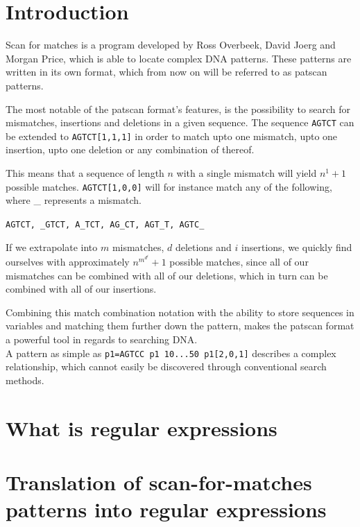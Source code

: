 \documentclass[12pt]{article}
\begin{document}
\newpage

\section{Introduction}

Scan for matches is a program developed by Ross Overbeek, David Joerg and Morgan Price, which is able to locate complex DNA patterns. These patterns are written in its own format, which from now on will be referred to as patscan patterns.\cite{scan-for-matches}

The most notable of the patscan format's features, is the possibility to search for mismatches, insertions and deletions in a given sequence. The sequence \texttt{AGTCT} can be extended to \texttt{AGTCT[1,1,1]} in order to match upto one mismatch, upto one insertion, upto one deletion or any combination of thereof.

This means that a sequence of length $n$ with a single mismatch will yield $n^1+1$ possible matches. \texttt{AGTCT[1,0,0]} will for instance match any of the following, where \_ represents a mismatch.

\texttt{AGTCT, \_GTCT, A\_TCT, AG\_CT, AGT\_T, AGTC\_}

If we extrapolate into $m$ mismatches, $d$ deletions and $i$ insertions, we quickly find ourselves with approximately  $n^{m^{d^{i}}}+1$ possible matches, since all of our mismatches can be combined with all of our deletions, which in turn can be combined with all of our insertions.

Combining this match combination notation with the ability to store sequences in variables and matching them further down the pattern, makes the patscan format a powerful tool in regards to searching DNA. \\
A pattern as simple as \texttt{p1=AGTCC p1 10...50 p1[2,0,1]} describes a complex relationship, which cannot easily be discovered through conventional search methods.

\newpage

\section{What is regular expressions}

\newpage

\section{Translation of scan-for-matches patterns into regular expressions}
\end{document}

